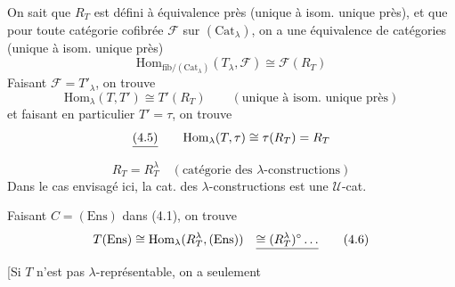 \documentclass[11pt,a4paper]{article}
\begin{document}
On sait que $R_{T}$ est défini à équivalence près (unique à isom. unique
près), et que pour toute catégorie cofibrée $\mathcal{F}$ sur
$(\mathrm{Cat}_{\lambda})$, on a une équivalence de catégories (unique à
isom. unique près)
\begin{equation}
  \mathrm{Hom}_{\mathrm{fib}/(\mathrm{Cat}_{\lambda})}(T_{\lambda}, \mathcal{F})
  \cong \mathcal{F}(R_{T})
  \tag{4.3}
\end{equation}
Faisant $\mathcal{F} = T'_{\lambda}$, on trouve
\begin{equation}
  \mathrm{Hom}_{\lambda}(T, T') \cong T'(R_{T})
  \qquad (\text{unique à isom. unique près})
  \tag{4.4}
\end{equation}
 et faisant en particulier $T' = \tau$, on trouve
\begin{equation}
  \struck{(4.5)}\qquad
  \mathrm{Hom}_{\lambda}(T, \tau) \cong \tau(R_{T}) = R_{T}
\end{equation}
\begin{equation}
  R_{T} = R^{\lambda}_{T} \quad (\text{catégorie des } \lambda\text{-constructions})
  \tag{4.5}
\end{equation}
   Dans le cas envisagé
ici, la \struck{[5] \ill{}} cat. des
$\lambda$-constructions est une $\mathcal{U}$-cat.

Faisant $C = (\mathrm{Ens})$ dans (4.1), on trouve
\begin{equation}
  T(\mathrm{Ens}) \cong \mathrm{Hom}_{\lambda}(R^{\lambda}_{T}, (\mathrm{Ens}))
  \quad \struck{\cong (R^{\lambda}_{T})^{\circ} \ldots}
  \tag{4.6}
\end{equation}
[Si $T$ n'est pas $\lambda$-représentable, on a seulement 
\end{document}

